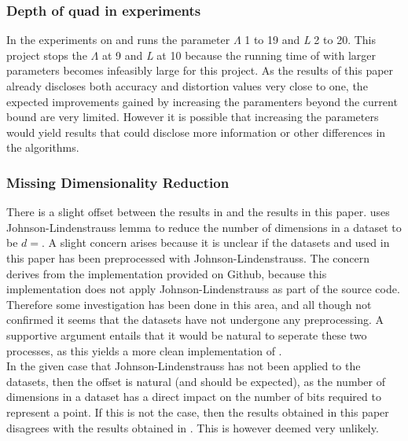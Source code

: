 \subsubsection{Depth of quad in experiments}
\label{disc/threats/depth}
In \cite{wagner17} the experiments on \qs{} and \grid{} runs the parameter $\Lambda$ 1 to 19 and \textit{L} 2 to 20. This project stops the $\Lambda$ at 9 and \textit{L} at 10 because the running time of \qs{} with larger parameters becomes infeasibly large for this project. As the results of this paper already discloses both accuracy and distortion values very close to one, the expected improvements gained by increasing the paramenters beyond the current bound are very limited. However it is possible that increasing the parameters would yield results that could disclose more information or other differences in the algorithms.

\subsubsection{Missing Dimensionality Reduction}
There is a slight offset between the results in \cite{wagner17} and the results in this paper. \cite{wagner17} uses Johnson-Lindenstrauss lemma to reduce the number of dimensions in a dataset to be $d=$. A slight concern arises because it is unclear if the datasets \mnist{} and \sift{} used in this paper has been preprocessed with Johnson-Lindenstrauss. The concern derives from the \qs{} implementation provided on Github, because this implementation does not apply Johnson-Lindenstrauss as part of the source code. Therefore some investigation has been done in this area, and all though not confirmed it seems that the datasets have not undergone any preprocessing. A supportive argument entails that it would be natural to seperate these two processes, as this yields a more clean implementation of \qs{}. 
\\
In the given case that Johnson-Lindenstrauss has not been applied to the datasets, then the offset is natural (and should be expected), as the number of dimensions in a dataset has a direct impact on the number of bits required to represent a point. If this is not the case, then the results obtained in this paper disagrees with the results obtained in \cite{wagner17}. This is however deemed very unlikely. 